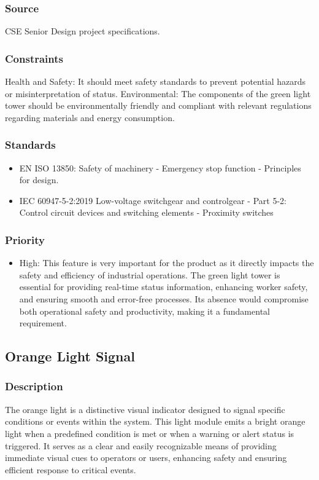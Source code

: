 \subsubsection{Source}
CSE Senior Design project specifications.
\subsubsection{Constraints}
Health and Safety: It should meet safety standards to prevent potential hazards or misinterpretation of status.
Environmental: The components of the green light tower should be environmentally friendly and compliant with relevant regulations regarding materials and energy consumption.
\subsubsection{Standards}
\begin{itemize}
\item EN ISO 13850: Safety of machinery - Emergency stop function - Principles for design.
\item IEC 60947-5-2:2019 Low-voltage switchgear and controlgear - Part 5-2: Control circuit devices and switching elements - Proximity switches
\end{itemize}
\subsubsection{Priority}
\begin{itemize}
\item High:
This feature is very important for the product as it directly impacts the safety and efficiency of industrial operations. The green light tower is essential for providing real-time status information, enhancing worker safety, and ensuring smooth and error-free processes. Its absence would compromise both operational safety and productivity, making it a fundamental requirement.
\end{itemize}
\subsection{Orange Light Signal}
\subsubsection{Description}
The orange light is a distinctive visual indicator designed to signal specific conditions or events within the system. This light module emits a bright orange light when a predefined condition is met or when a warning or alert status is triggered. It serves as a clear and easily recognizable means of providing immediate visual cues to operators or users, enhancing safety and ensuring efficient response to critical events.

